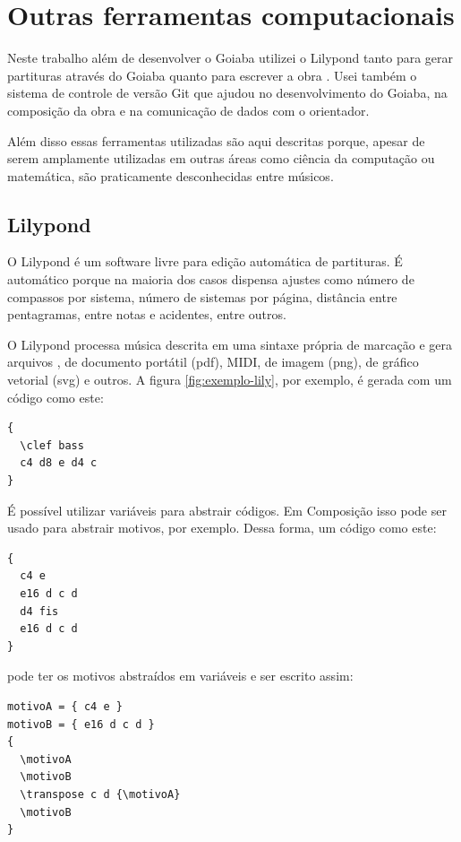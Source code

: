\section{Outras ferramentas computacionais}
\label{sec:outr-ferr-comp}

Neste trabalho além de desenvolver o Goiaba utilizei o Lilypond tanto
para gerar partituras através do Goiaba quanto para escrever a obra
\obra{}. Usei também o sistema de controle de versão Git que ajudou no
desenvolvimento do Goiaba, na composição da obra e na comunicação de
dados com o orientador.

Além disso essas ferramentas utilizadas são aqui descritas porque,
apesar de serem amplamente utilizadas em outras áreas como ciência da
computação ou matemática, são praticamente desconhecidas entre
músicos.

\subsection{Lilypond}
\label{sec:lilypond}

O Lilypond \cite{nienhuys.ea08:lilypond} é um software livre para
edição automática de partituras. É automático porque na maioria dos
casos dispensa ajustes como número de compassos por sistema, número de
sistemas por página, distância entre pentagramas, entre notas e
acidentes, entre outros.

O Lilypond processa música descrita em uma sintaxe própria de marcação
e gera arquivos , de documento portátil (pdf), MIDI,
de imagem (png), de gráfico vetorial (svg) e outros. A figura
\ref{fig:exemplo-lily}, por exemplo, é gerada com um código como este:

\singlespacing
\begin{verbatim}
{
  \clef bass 
  c4 d8 e d4 c 
}
\end{verbatim}
\doublespacing

É possível utilizar variáveis para abstrair códigos. Em Composição
isso pode ser usado para abstrair motivos, por exemplo. Dessa forma,
um código como este:

\singlespacing
\begin{verbatim}
{
  c4 e
  e16 d c d
  d4 fis
  e16 d c d
}
\end{verbatim}
\doublespacing

pode ter os motivos abstraídos em variáveis e ser escrito assim:

\singlespacing
\begin{verbatim}
motivoA = { c4 e }
motivoB = { e16 d c d }
{
  \motivoA
  \motivoB
  \transpose c d {\motivoA}
  \motivoB
}
\end{verbatim}
\doublespacing

